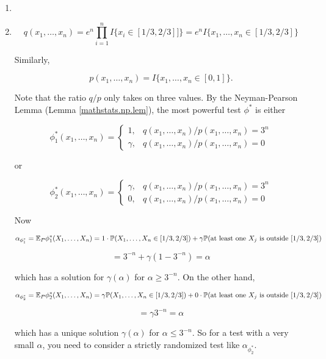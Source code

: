 \begin{solution}

\begin{enumerate}

\item

\item

\[
q(x_1, \ldots, x_n) = e^n  \prod_{i=1}^n I \{x_i \in [1/3, 2/3] ]\} = e^n I \{x_1, \ldots, x_n \in [1/3, 2/3]\}
\]

Similarly,

\[
p(x_1, \ldots, x_n) = I \{x_1, \ldots, x_n \in [0,1]\}.
\]

Note that the ratio \(q/p\) only takes on three values. By the Neyman-Pearson Lemma (Lemma \ref{mathstats.np.lem}), the most powerful test \(\phi^*\) is either

\[
\phi_1^*(x_1, \ldots, x_n) = \begin{cases}
1, & q(x_1, \ldots, x_n)/p(x_1, \ldots, x_n) = 3^n  \\
\gamma, & q(x_1, \ldots, x_n) /p(x_1, \ldots, x_n) = 0 
\end{cases}
\]

or

\[
\phi_2^*(x_1, \ldots, x_n) = \begin{cases}
\gamma, & q(x_1, \ldots, x_n)/p(x_1, \ldots, x_n) = 3^n  \\
0, & q(x_1, \ldots, x_n) /p(x_1, \ldots, x_n) = 0 
\end{cases}
\]

Now

\[
\alpha_{\phi_1^*} = \E_P \phi_1^* (X_1, \ldots, X_n) = 1 \cdot \mathbb{P}(X_1, \ldots, X_n \in [1/3, 2/3]) + \gamma \mathbb{P}(\text{at least one } X_j \text{ is outside } [1/3, 2/3])
\]

\[
= 3^{-n} + \gamma(1 - 3^{-n}) = \alpha 
\]

which has a solution for \(\gamma(\alpha)\) for \(\alpha \geq 3^{-n}\). On the other hand,

\[
\alpha_{\phi_2^*} = \E_P \phi_2^* (X_1, \ldots, X_n) = \gamma \mathbb{P}(X_1, \ldots, X_n \in [1/3, 2/3]) + 0 \cdot \mathbb{P}(\text{at least one } X_j \text{ is outside } [1/3, 2/3])
\]

\[
= \gamma 3^{-n} = \alpha
\]

which has a unique solution \(\gamma(\alpha)\) for \(\alpha \leq 3^{-n}\). So for a test with a very small \(\alpha\), you need to consider a strictly randomized test like \(\alpha_{\phi_2^*}\). 

\end{enumerate}

\end{solution}


